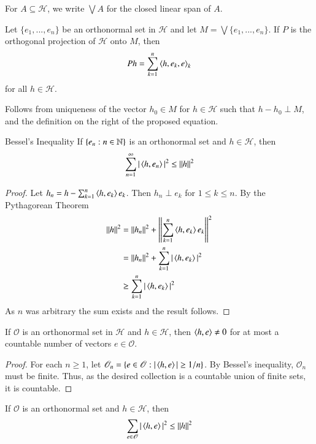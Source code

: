 For $A \subseteq \mathscr{H}$, we write $\bigvee A$ for the closed linear span of $A$.

\begin{prop}
    Let $\{e_1,...,e_n\}$ be an orthonormal set in $\mathscr{H}$ and let $M = \bigvee\{e_1,...,e_n\}$. If $P$ is the orthogonal projection of $\mathscr{H}$ onto $M$, then $$Ph = \sum_{k=1}^n\left\langle h,e_k, e\right\rangle_k$$
    for all $h \in \mathscr{H}$.
\end{prop}

Follows from uniqueness of the vector $h_0 \in M$ for $h \in \mathscr{H}$ such that $h-h_0 \perp M$, and the definition on the right of the proposed equation.

\begin{nthm}{Bessel's Inequality}
    If $\{e_n:n \in \mathbb N\}$ is an orthonormal set and $h \in \mathscr{H}$, then $$\sum_{n=1}^{\infty}|\left\langle h, e_n\right\rangle|^2 \leq \left|\left| h\right|\right|^2$$
\end{nthm}
\begin{proof}
    Let $h_n = h - \sum_{k=1}^n\left\langle h, e_k\right\rangle e_k$. Then $h_n \perp e_k$ for $1\leq k \leq n$. By the Pythagorean Theorem \begin{align*}
        \left|\left| h\right|\right|^2 &= \left|\left| h_n\right|\right|^2 + \left|\left| \sum_{k=1}^n\left\langle h, e_k\right\rangle e_k\right|\right|^2 \\
        &= \left|\left| h_n\right|\right|^2 + \sum_{k=1}^n|\left\langle h, e_k\right\rangle|^2 \\
        &\geq \sum_{k=1}^n|\left\langle h, e_k\right\rangle|^2
    \end{align*}
    As $n$ was arbitrary the sum exists and the result follows.
\end{proof}

\begin{cor}
    If $\mathscr{O}$ is an orthonormal set in $\mathscr{H}$ and $h \in \mathscr{H}$, then $\left\langle h, e\right\rangle \neq 0$ for at most a countable number of vectors $e \in \mathscr{O}$.
\end{cor}
\begin{proof}
    For each $n \geq 1$, let $\mathscr{O}_n = \{e \in \mathscr{O}:|\left\langle h, e\right\rangle| \geq 1/n\}$. By Bessel's inequality, $\mathscr{O}_n$ must be finite. Thus, as the desired collection is a countable union of finite sets, it is countable.
\end{proof}

\begin{cor}
    If $\mathscr{O}$ is an orthonormal set and $h \in \mathscr{H}$, then $$\sum_{e \in \mathscr{O}}|\left\langle h, e\right\rangle|^2 \leq \left|\left| h\right|\right|^2$$
\end{cor}

